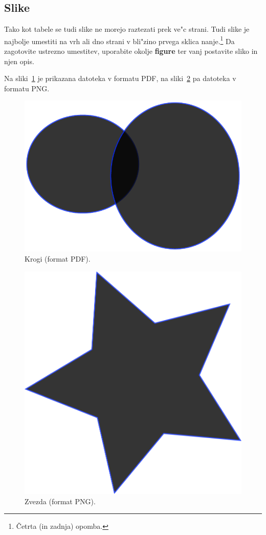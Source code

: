 \documentclass[sigconf,nonacm]{acmart}
\begin{document}
\subsection{Slike}

Tako kot tabele se tudi slike ne morejo raztezati prek ve"c strani. Tudi slike
je najbolje umestiti na vrh ali dno strani v bli"zino prvega sklica
nanje.\footnote{Četrta (in zadnja) opomba.}  Da zagotovite ustrezno umestitev,
uporabite okolje \textbf{figure} ter vanj postavite sliko in njen opis.

Na sliki~\ref{fig:circles} je prikazana datoteka v formatu PDF, na
sliki~\ref{fig:star} pa datoteka v formatu PNG\@.

\begin{figure}
    \centering
    \includegraphics[scale=0.5]{circles.pdf}
    \caption{Krogi (format PDF).}
    \label{fig:circles}
\end{figure}

\begin{figure}
    \centering
    \includegraphics[scale=0.5]{star.png}
    \caption{Zvezda (format PNG).}
    \label{fig:star}
\end{figure}
\end{document}
